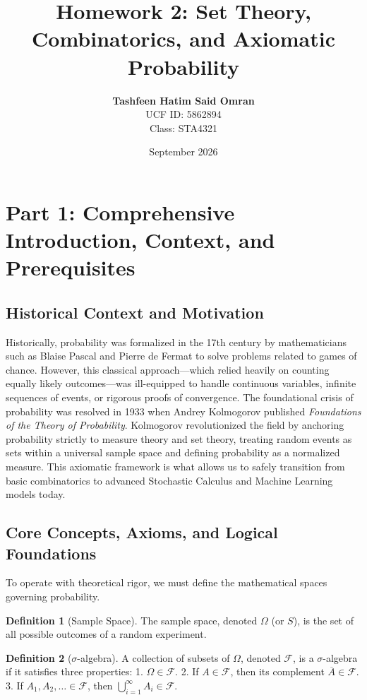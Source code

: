 \documentclass[11pt, letterpaper]{article}
\title{\textbf{Homework 2: Set Theory, Combinatorics, and Axiomatic Probability}}
\author{
    \textbf{Tashfeen Hatim Said Omran} \\ 
    UCF ID: 5862894 \\ 
    Class: STA4321
}
\date{September 2026}
\theoremstyle{definition}
\newtheorem{definition}{Definition}[section]
\theoremstyle{remark}
\newcommand{\comp}[1]{\overline{#1}}
\begin{document}
\maketitle
\tableofcontents
\newpage

\section{Part 1: Comprehensive Introduction, Context, and Prerequisites}

\subsection{Historical Context and Motivation}
Historically, probability was formalized in the 17th century by mathematicians such as Blaise Pascal and Pierre de Fermat to solve problems related to games of chance. However, this classical approach---which relied heavily on counting equally likely outcomes---was ill-equipped to handle continuous variables, infinite sequences of events, or rigorous proofs of convergence. The foundational crisis of probability was resolved in 1933 when Andrey Kolmogorov published \textit{Foundations of the Theory of Probability}. Kolmogorov revolutionized the field by anchoring probability strictly to measure theory and set theory, treating random events as sets within a universal sample space and defining probability as a normalized measure. This axiomatic framework is what allows us to safely transition from basic combinatorics to advanced Stochastic Calculus and Machine Learning models today.

\subsection{Core Concepts, Axioms, and Logical Foundations}
To operate with theoretical rigor, we must define the mathematical spaces governing probability.

\begin{definition}[Sample Space]
The sample space, denoted $\Omega$ (or $S$), is the set of all possible outcomes of a random experiment.
\end{definition}

\begin{definition}[$\sigma$-algebra]
A collection of subsets of $\Omega$, denoted $\mathscr{F}$, is a $\sigma$-algebra if it satisfies three properties:
1. $\Omega \in \mathscr{F}$.
2. If $A \in \mathscr{F}$, then its complement $\comp{A} \in \mathscr{F}$.
3. If $A_{1}, A_{2}, \dots \in \mathscr{F}$, then $\bigcup_{i=1}^{\infty} A_{i} \in \mathscr{F}$.
\end{definition}
\end{document}
